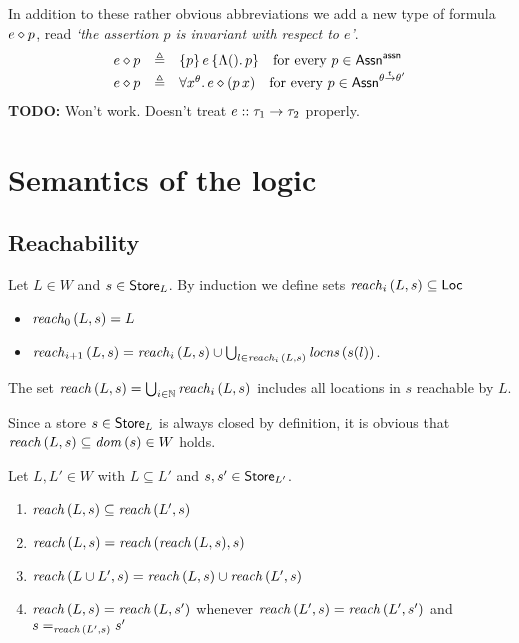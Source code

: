 \documentclass[12pt,a4paper]{report}
\begin{document}
In addition to these rather obvious abbreviations we add a new type of formula
${{e}\diamond{p}}$, read {\em `the assertion $p$ is invariant with respect to $e$'}.
\[\begin{array}{rcll}
  {{e}\diamond{p}} &\triangleq& \{p\}\,e\,\{\Lambda \mathsf{()}.\,p\} \quad \text{for every } p\in\mathsf{Assn}^{\mathsf{assn}} \\
  {{e}\diamond{p}} &\triangleq& \forall x^\theta.\,{{e}\diamond{(p\,x)}} \quad \text{for every } p\in\mathsf{Assn}^{\theta\stackrel{_t}{\to}\theta'}
\end{array}\]
{\bf TODO:} Won't work. Doesn't treat ${e}\mathrel{::}{\tau_1\to\tau_2}$ properly.



\section{Semantics of the logic}



\subsection{Reachability}

\begin{definition}[Reachability]
  Let $L\in W$ and $s\in\mathsf{Store}_L$. By induction we define sets $\mathit{reach}_{i}\,(L,s) \subseteq \mathsf{Loc}$
  \begin{itemize}
    \item $\mathit{reach}_{0}\,(L,s) = L$
    \item $\mathit{reach}_{i+1}\,(L,s) = \mathit{reach}_{i}\,(L,s) \cup \bigcup_{l\in\mathit{reach}_{i}\,(L,s)} \mathit{locns}\,(s(l))$.
  \end{itemize}
  The set $\mathit{reach}\,(L,s) = \bigcup_{i\in\mathbb N} \mathit{reach}_{i}\,(L,s)$ includes all locations in $s$ reachable
  by $L$.
\end{definition}

Since a store $s\in\mathsf{Store}_L$ is always closed by definition, it is obvious that
$\mathit{reach}\,(L,s) \subseteq \mathit{dom}\,(s) \in  W$ holds.

\begin{lemma}[Reachability] \label{lemma:Reachability}
  Let $L,L'\in W$ with $L \subseteq L'$ and $s,s'\in\mathsf{Store}_{L'}$.
  \begin{enumerate}
    \item $\mathit{reach}\,(L,s) \subseteq \mathit{reach}\,(L',s)$
    \item $\mathit{reach}\,(L,s) = \mathit{reach}\,(\mathit{reach}\,(L,s),s)$
    \item $\mathit{reach}\,(L \cup L',s) = \mathit{reach}\,(L,s) \cup \mathit{reach}\,(L',s)$
    \item $\mathit{reach}\,(L,s) = \mathit{reach}\,(L,s')$ whenever $\mathit{reach}\,(L',s) = \mathit{reach}\,(L',s')$
          and $s =_{\mathit{reach}\,(L',s)} s'$
  \end{enumerate}
\end{lemma}
\end{document}
